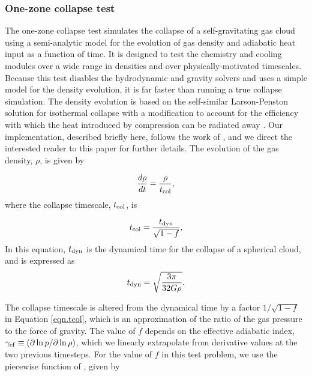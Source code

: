 \subsubsection{One-zone collapse test}
\label{sec.tests.1-zone}

The one-zone collapse test simulates the collapse of a
self-gravitating gas cloud using a semi-analytic model for the
evolution of gas density and adiabatic heat input as a function of
time.  It is designed to test the chemistry and cooling modules over a
wide range in densities and over physically-motivated timescales.
Because this test disables the hydrodynamic and gravity solvers and
uses a simple model for the density evolution, it is far faster than
running a true collapse simulation.  The density evolution is based on
the self-similar Larson-Penston solution for isothermal collapse \citep{1969MNRAS.145..271L,
1969MNRAS.144..425P} with a
modification to account for the efficiency with which the heat
introduced by compression can be radiated away
\citep{1983ApJ...265.1047Y}.  Our implementation, described briefly
here, follows the work of \citet{2005ApJ...626..627O}, and we direct
the interested reader to this paper for further details.  The
evolution of the gas density, $\rho$, is given by

\begin{equation}
\frac{d\rho}{dt} = \frac{\rho}{t_{\rm col}},
\end{equation}
where the collapse timescale, $t_{\rm col}$, is

\begin{equation} \label{eqn.tcol}
t_{\rm col} = \frac{t_{\rm dyn}}{\sqrt{1 - f}},
\end{equation}
In this equation, $t_{\rm dyn}$ is the dynamical time for the collapse
of a spherical cloud, and is expressed as
\begin{equation}
t_{\rm dyn} = \sqrt{\frac{3 \pi}{32 G \rho}}.
\end{equation}

 The collapse timescale is altered from the dynamical time by a factor
$1/\sqrt{1-f}$ in Equation
\ref{eqn.tcol}, which is an approximation of the ratio of the gas
pressure to the force of gravity.  The value of $f$ depends on the
effective adiabatic index, $\gamma_{\rm ef} \equiv (\partial \ln p
/ \partial \ln \rho)$, which we linearly extrapolate
from derivative values at the two previous timesteps.  For the value
of $f$ in this test problem, we use the piecewise function of
\citet{2005ApJ...626..627O}, given by

